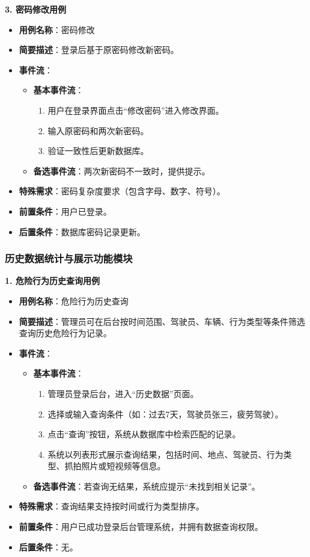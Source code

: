 \documentclass[a4paper,12pt]{article}
\begin{document}
\textbf{3. 密码修改用例}
\begin{itemize}
    \item \textbf{用例名称}：密码修改
    \item \textbf{简要描述}：登录后基于原密码修改新密码。
    \item \textbf{事件流}：
    \begin{itemize}
        \item \textbf{基本事件流}：
        \begin{enumerate}
            \item 用户在登录界面点击“修改密码”进入修改界面。
            \item 输入原密码和两次新密码。
            \item 验证一致性后更新数据库。
        \end{enumerate}
        \item \textbf{备选事件流}：两次新密码不一致时，提供提示。
    \end{itemize}
    \item \textbf{特殊需求}：密码复杂度要求（包含字母、数字、符号）。
    \item \textbf{前置条件}：用户已登录。
    \item \textbf{后置条件}：数据库密码记录更新。
\end{itemize}

\subsubsection{历史数据统计与展示功能模块}

\textbf{1. 危险行为历史查询用例}
\begin{itemize}
    \item \textbf{用例名称}：危险行为历史查询
    \item \textbf{简要描述}：管理员可在后台按时间范围、驾驶员、车辆、行为类型等条件筛选查询历史危险行为记录。
    \item \textbf{事件流}：
    \begin{itemize}
        \item \textbf{基本事件流}：
        \begin{enumerate}
            \item 管理员登录后台，进入“历史数据”页面。
            \item 选择或输入查询条件（如：过去7天，驾驶员张三，疲劳驾驶）。
            \item 点击“查询”按钮，系统从数据库中检索匹配的记录。
            \item 系统以列表形式展示查询结果，包括时间、地点、驾驶员、行为类型、抓拍照片或短视频等信息。
        \end{enumerate}
        \item \textbf{备选事件流}：若查询无结果，系统应提示“未找到相关记录”。
    \end{itemize}
    \item \textbf{特殊需求}：查询结果支持按时间或行为类型排序。
    \item \textbf{前置条件}：用户已成功登录后台管理系统，并拥有数据查询权限。
    \item \textbf{后置条件}：无。
\end{itemize}
\end{document}
